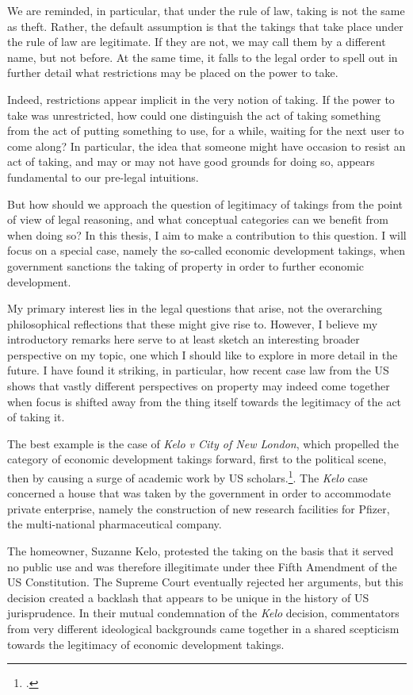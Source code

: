 \documentclass{book} %
\begin{document}
We are reminded, in particular, that under the rule of law, taking is not the same as theft. Rather, the default assumption is that the takings that take place under the rule of law are legitimate. If they are not, we may call them by a different name, but not before. At the same time, it falls to the legal order to spell out in further detail what restrictions may be placed on the power to take. 

Indeed, restrictions appear implicit in the very notion of taking. If the power to take was unrestricted, how could one distinguish the act of taking something from the act of putting something to use, for a while, waiting for the next user to come along? In particular, the idea that someone might have occasion to resist an act of taking, and may or may not have good grounds for doing so, appears fundamental to our pre-legal intuitions.

But how should we approach the question of legitimacy of takings from the point of view of legal reasoning, and what conceptual categories can we benefit from when doing so? In this thesis, I aim to make a contribution to this question. I will focus on a special case, namely the so-called economic development takings, when government sanctions the taking of property in order to further economic development.

My primary interest lies in the legal questions that arise, not the overarching philosophical reflections that these might give rise to. However, I believe my introductory remarks here serve to at least sketch an interesting broader perspective on my topic, one which I should like to explore in more detail in the future. I have found it striking, in particular, how recent case law from the US shows that vastly different perspectives on property may indeed come together when focus is shifted away from the thing itself towards the legitimacy of the act of taking it.

The best example is the case of {\it Kelo v City of New London}, which propelled the category of economic development takings forward, first to the political scene, then by causing a surge of academic work by US scholars.\footcite{kelo05}. The {\it Kelo} case concerned a house that was taken by the government in order to accommodate private enterprise, namely the construction of new research facilities for Pfizer, the multi-national pharmaceutical company.

The homeowner, Suzanne Kelo, protested the taking on the basis that it served no public use and was therefore illegitimate under thee Fifth Amendment of the US Constitution. The Supreme Court eventually rejected her arguments, but this decision created a backlash that appears to be unique in the history of US jurisprudence. In their mutual condemnation of the {\it Kelo} decision, commentators from very different ideological backgrounds came together in a shared scepticism towards the legitimacy of economic development takings.
\end{document}
